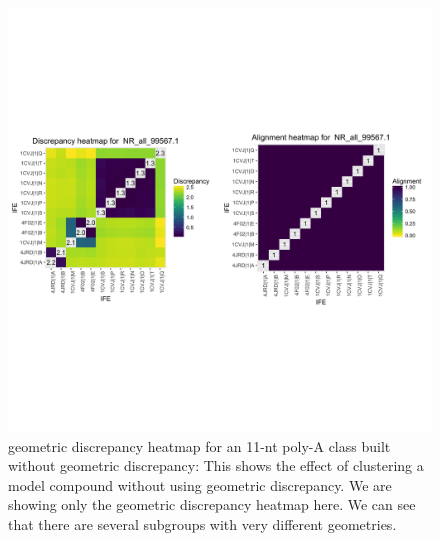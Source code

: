 \begin{figure}[h]
  \includegraphics[width=\textwidth]{chapter-3/figs/small-aa-no-disc}
  \caption{geometric discrepancy heatmap for an 11-nt poly-A class built without
    geometric discrepancy: This shows the effect of clustering a model compound without
    using geometric discrepancy. We are showing only the geometric discrepancy heatmap here. We can
  see that there are several subgroups with very different geometries.}
  \label{fig:small-aa-no-disc}
\end{figure}


